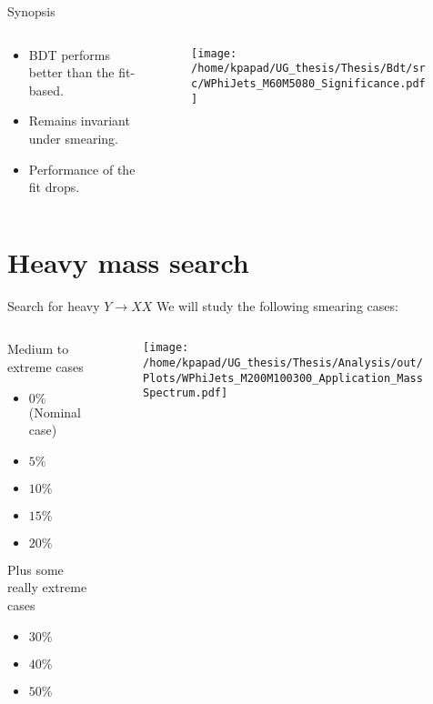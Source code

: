 \documentclass[bigger]{beamer}
\begin{document}
\begin{frame}[label={sec:orgb9c7d05}]{Synopsis}
\begin{columns}
\begin{column}{0.5\columnwidth}
\begin{itemize}
\item BDT performs better than the fit-based.
\item Remains invariant under smearing.
\item Performance of the fit drops.
\end{itemize}
\end{column}
\begin{column}{0.5\columnwidth}
\begin{figure}
\centering
\texttt{[image: /home/kpapad/UG\_thesis/Thesis/Bdt/src/WPhiJets\_M60M5080\_Significance.pdf]}
\end{figure}
\end{column}
\end{columns}
\end{frame}

\section{Heavy mass search}
\label{sec:org03fa458}
\begin{frame}[label={sec:org0fecfb2}]{Search for heavy \(Y \rightarrow XX\)}
We will study the following smearing cases:\newline

\begin{columns}
\begin{column}{0.5\columnwidth}
Medium to extreme cases
\begin{itemize}
\item \(0\%\)(Nominal case)
\item \(5\%\)
\item \(10\%\)
\item \(15\%\)
\item \(20\%\)
\end{itemize}
\newline Plus some really extreme cases
\begin{itemize}
\item \(30\%\)
\item \(40\%\)
\item \(50\%\)
\end{itemize}
\end{column}

\begin{column}{0.5\columnwidth}
\begin{figure}[h]
\centering
\texttt{[image: /home/kpapad/UG\_thesis/Thesis/Analysis/out/Plots/WPhiJets\_M200M100300\_Application\_MassSpectrum.pdf]}
\end{figure}
\end{column}
\end{columns}
\end{frame}
\end{document}
